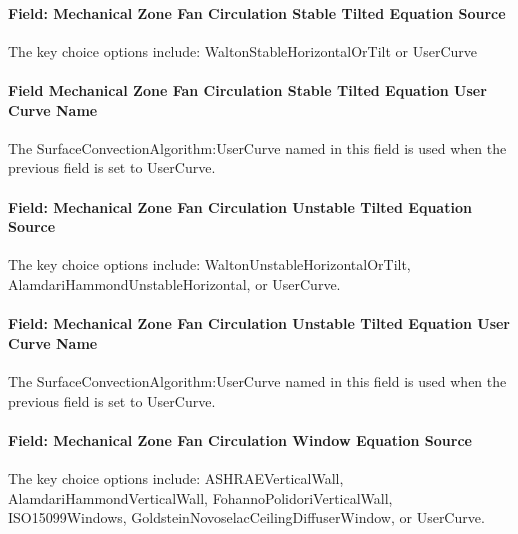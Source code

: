 \paragraph{Field: Mechanical Zone Fan Circulation Stable Tilted Equation Source}\label{field-mechanical-zone-fan-circulation-stable-tilted-equation-source}

The key choice options include: WaltonStableHorizontalOrTilt or UserCurve

\paragraph{Field Mechanical Zone Fan Circulation Stable Tilted Equation User Curve Name}\label{field-mechanical-zone-fan-circulation-stable-tilted-equation-user-curve-name}

The SurfaceConvectionAlgorithm:UserCurve named in this field is used when the previous field is set to UserCurve.

\paragraph{Field: Mechanical Zone Fan Circulation Unstable Tilted Equation Source}\label{field-mechanical-zone-fan-circulation-unstable-tilted-equation-source}

The key choice options include: WaltonUnstableHorizontalOrTilt, AlamdariHammondUnstableHorizontal, or UserCurve.

\paragraph{Field: Mechanical Zone Fan Circulation Unstable Tilted Equation User Curve Name}\label{field-mechanical-zone-fan-circulation-unstable-tilted-equation-user-curve-name}

The SurfaceConvectionAlgorithm:UserCurve named in this field is used when the previous field is set to UserCurve.

\paragraph{Field: Mechanical Zone Fan Circulation Window Equation Source}\label{field-mechanical-zone-fan-circulation-window-equation-source}

The key choice options include: ASHRAEVerticalWall, AlamdariHammondVerticalWall, FohannoPolidoriVerticalWall, ISO15099Windows, GoldsteinNovoselacCeilingDiffuserWindow, or UserCurve.

